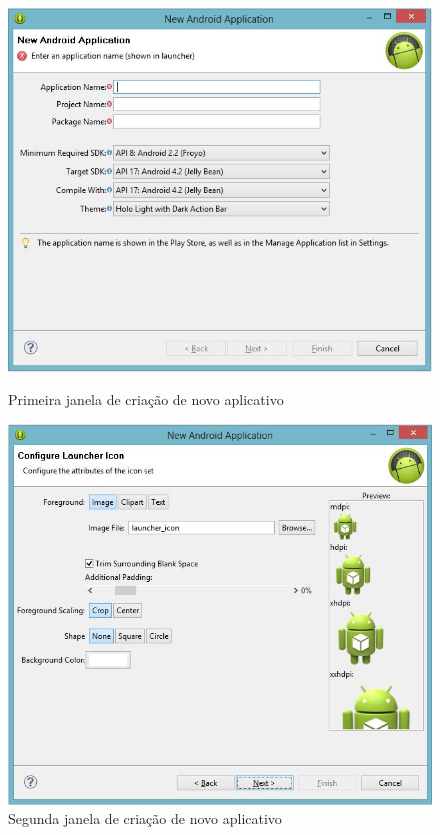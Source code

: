 \documentclass[a4paper,12pt,brazil,doubleside]{book}
\begin{document}
\begin{figure}[H]
  \centering
  \includegraphics[width=.8\textwidth]{figuras/1-criando-app.jpg}
  \caption{Primeira janela de criação de novo aplicativo}
  \label{fig:d}
  \includegraphics[width=.8\textwidth]{figuras/2-criando-app.jpg}
  \caption{Segunda janela de criação de novo aplicativo}
  \label{fig:c}
\end{figure}
\end{document}
